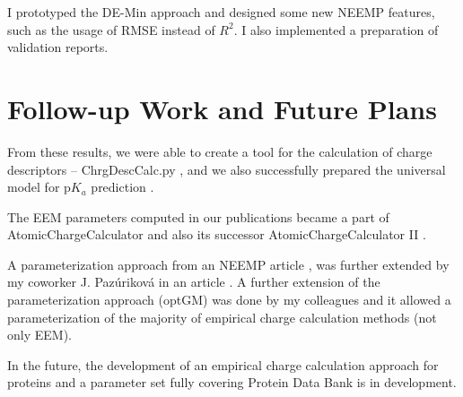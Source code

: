 I prototyped the DE-Min approach and designed some new NEEMP features, such as
the usage of RMSE instead of $R^2$. I also implemented a preparation of validation
reports.

\chapter{Follow-up Work and Future Plans}

From these results, we were able to create a tool for the calculation
of charge descriptors -- ChrgDescCalc.py \cite{Hejret2015}, and we also
successfully prepared the universal model for p$K_a$ prediction \cite{Hejret2017}.

The EEM parameters computed in our publications \cite{Geidl2015_eem, Racek2016}
became a part of AtomicChargeCalculator \cite{Ionescu2015} and also its successor 
AtomicChargeCalculator II \cite{Racek2020}.

A parameterization approach from an NEEMP article \cite{Racek2016}, was further
extended by my coworker J. Pazúriková in an article \cite{Pazurikova2016}.
A further extension of the parameterization approach
(optGM) was done by my colleagues \cite{Schindler2021} and it allowed a parameterization
of the majority of empirical charge calculation methods (not only EEM).

In the future, the development of an empirical charge calculation approach
for proteins and a parameter set fully covering Protein Data Bank is
in development.

